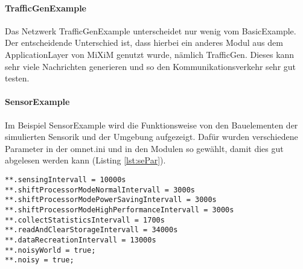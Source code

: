 \paragraph{TrafficGenExample}

Das Netzwerk TrafficGenExample unterscheidet nur wenig vom BasicExample. Der entscheidende Unterschied ist, dass hierbei ein anderes Modul aus dem ApplicationLayer von MiXiM genutzt wurde, nämlich TrafficGen. Dieses kann sehr viele Nachrichten generieren und so den Kommunikationsverkehr sehr gut testen.

\paragraph{SensorExample}

Im Beispiel SensorExample wird die Funktionsweise von den Bauelementen der simulierten Sensorik und der Umgebung aufgezeigt. Dafür wurden verschiedene Parameter in der omnet.ini und in den Modulen so gewählt, damit dies gut abgelesen werden kann (Listing \ref{lst:sePar}).\\

\begin{lstlisting}[language=ned,caption={Parameter für das Beispiel SensorExample},label=lst:sePar]
**.sensingIntervall = 10000s
**.shiftProcessorModeNormalIntervall = 3000s
**.shiftProcessorModePowerSavingIntervall = 3000s
**.shiftProcessorModeHighPerformanceIntervall = 3000s
**.collectStatisticsIntervall = 1700s
**.readAndClearStorageIntervall = 34000s
**.dataRecreationIntervall = 13000s
**.noisyWorld = true;
**.noisy = true; 
\end{lstlisting}

